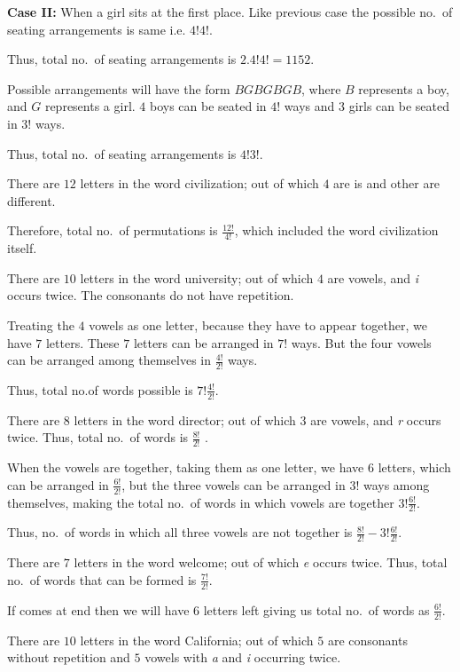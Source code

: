   {\bf Case II:} When a girl sits at the first place. Like previous case the possible no.\ of seating
  arrangements is same i.e. $4!4!$.

  Thus, total no.\ of seating arrangements is $2.4!4! = 1152$.
\item Possible arrangements will have the form $BGBGBGB$, where $B$ represents a boy, and $G$ represents a
  girl. $4$ boys can be seated in $4!$ ways and $3$ girls can be seated in $3!$ ways.

  Thus, total no.\ of seating arrangements is $4!3!$.
\item There are $12$ letters in the word civilization; out of which $4$ are i\symbol[rightquote]s and other are different.

  Therefore, total no.\ of permutations is $\frac{12!}{4!}$, which included the word civilization itself.
\item There are $10$ letters in the word university; out of which $4$ are vowels, and {\it i} occurs
  twice. The consonants do not have repetition.

  Treating the $4$ vowels as one letter, because they have to appear together, we have $7$ letters. These
  $7$ letters can be arranged in $7!$ ways. But the four vowels can be arranged among themselves in
  $\frac{4!}{2!}$ ways.

  Thus, total no.of words possible is $7!\frac{4!}{2!}$.
\item There are $8$ letters in the word director; out of which $3$ are vowels, and {\it r} occurs
  twice. Thus, total no.\ of words is $\frac{8!}{2!}$ .

  When the vowels are together, taking them as one letter, we have $6$ letters, which can be arranged in
  $\frac{6!}{2!}$, but the three vowels can be arranged in $3!$ ways among themselves, making the total
  no.\ of words in which vowels are together $3!\frac{6!}{2!}$.

  Thus, no.\ of words in which all three vowels are not together is $\frac{8!}{2!} - 3!\frac{6!}{2!}$.
\item There are $7$ letters in the word welcome; out of which {\it e} occurs twice. Thus, total no.\ of words
  that can be formed is $\frac{7!}{2!}$.

  If  comes at end then we will have $6$ letters left giving us total no.\ of words as
  $\frac{6!}{2!}$.
\item There are $10$ letters in the word California; out of which $5$ are consonants without repetition and
  $5$ vowels with {\it a} and {\it i} occurring twice.

